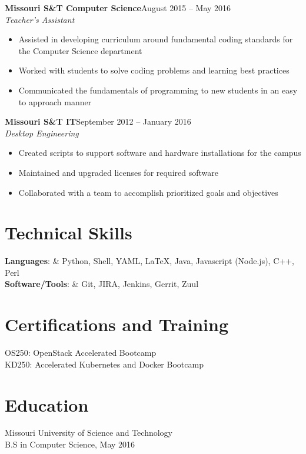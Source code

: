 \documentclass[margin]{res}
\begin{document}
   \textbf{Missouri S\&T Computer Science}\hfill August 2015 -- May 2016\\
   \textit{Teacher's Assistant} 
   \begin{itemize} \itemsep -1pt  %
     \item Assisted in developing curriculum around fundamental coding standards for the Computer Science department
     \item Worked with students to solve coding problems and learning best practices
     \item Communicated the fundamentals of programming to new students in an easy to approach manner
   \end{itemize}

	   \textbf{Missouri S\&T IT}\hfill September 2012 -- January 2016\\
   \textit{Desktop Engineering}\hfill
   \begin{itemize} \itemsep -1pt  %
     \item Created scripts to support software and hardware installations for the campus
     \item Maintained and upgraded licenses for required software
     \item Collaborated with a team to accomplish prioritized goals and objectives
   \end{itemize}
   
\section{Technical Skills}
    \textbf{Languages}: & Python, Shell, YAML, \LaTeX, Java, Javascript (Node.js), C++, Perl \\
    \textbf{Software/Tools}: & Git, JIRA, Jenkins, Gerrit, Zuul

\section{Certifications and Training}
  OS250: OpenStack Accelerated Bootcamp \\
  KD250: Accelerated Kubernetes and Docker Bootcamp
 
\section{Education}
  Missouri University of Science and Technology \\ 
  B.S in Computer Science, May 2016
\end{document}
